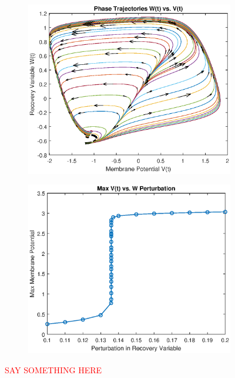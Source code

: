 \documentclass{book}
\theoremstyle{definition}
\begin{document}
\begin{figure}[!htb]
	\centering
	\begin{subfigure}{0.5\textwidth}
		\centering
		\includegraphics[scale=0.6]{FHN_lab/V_W_I_1.eps}
	\end{subfigure}%
	\begin{subfigure}{0.5\textwidth}
		\centering
		\includegraphics[scale=0.6]{FHN_lab/thres_I_1.eps}
		
	\end{subfigure}%
	\caption{\textcolor{red}{SAY SOMETHING HERE}}
	\label{Fig:11}
\end{figure}
\end{document}
